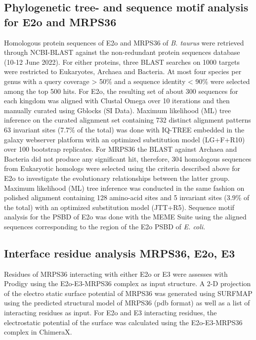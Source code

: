 \documentclass[times, twoside]{zHenriquesLab-StyleBioRxiv}
\begin{document}
\subsection*{Phylogenetic tree- and sequence motif analysis for E2o and MRPS36}
Homologous protein sequences of E2o and MRPS36 of \emph{B. taurus} were retrieved through NCBI-BLAST against the non-redundant protein sequences database (10-12 June 2022). For either proteins, three BLAST searches on 1000 targets were restricted to Eukaryotes, Archaea and Bacteria. At most four species per genus with a query coverage > 50\% and a sequence identity < 90\% were selected among the top 500 hits. For E2o, the resulting set of about 300 sequences for each kingdom was aligned with Clustal Omega \cite{Sievers_2018} over 10 iterations and then manually curated using Gblocks \cite{Talavera_2007} (SI Data). Maximum likelihood (ML) tree inference on the curated alignment set containing 732 distinct alignment patterns 63 invariant sites (7.7\% of the total)  was done with IQ-TREE \cite{Minh_2020} embedded in the galaxy webserver platform \cite{Afgan_2016} with an optimized substitution model (LG+F+R10) over 100 bootstrap replicates. For MRPS36 the BLAST against Archaea and Bacteria did not produce any significant hit, therefore, 304 homologous sequences from Eukaryotic homologs were selected using the criteria described above for E2o to investigate the evolutionary relationships between the latter group. Maximum likelihood (ML) tree inference  was conducted in the same fashion on polished alignment containing 128 amino-acid sites and 5 invariant sites (3.9\% of the total) with an optimized substitution model (JTT+R5). Sequence motif analysis for the PSBD of E2o was done with the MEME Suite \cite{Bailey_2015} using the aligned sequences corresponding to the region of the E2o PSBD of \emph{E. coli}.

\subsection*{Interface residue analysis MRPS36, E2o, E3}
Residues of MRPS36 interacting with either E2o or E3 were assesses with Prodigy \cite{Vangone_2015} using the E2o-E3-MRPS36 complex as input structure. A 2-D projection of the electro static surface potential of MRPS36 was generated using SURFMAP \cite{Schweke_2022} using the predicted structural model of MRPS36 (pdb format) as well as a list of interacting residues as input. For E2o and E3 interacting residues, the electrostatic potential of the surface was calculated using the E2o-E3-MRPS36 complex in ChimeraX.
\end{document}

